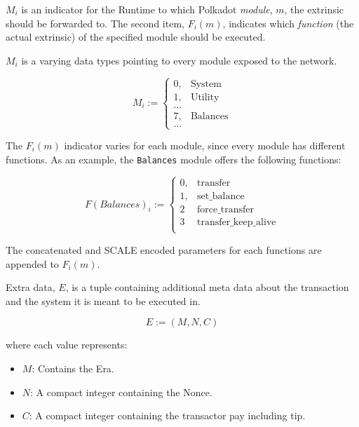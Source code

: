 \begin{definition}
    \label{defn-module-indicator}
    $M_i$ is an indicator for the Runtime to which Polkadot \textit{module},
    $m$, the extrinsic should be forwarded to. The second item, $F_i(m)$,
    indicates which \textit{function} (the actual extrinsic) of the specified
    module should be executed.
    \newline

    $M_i$ is a varying data types pointing to every module exposed to the
    network.

    \[
    M_i :=
    \begin{cases}
    0, & \text{System} \\
    1, & \text{Utility} \\
    ... & \\
    7, & \text{Balances} \\
    ... &
    \end{cases}
    \]
\end{definition}

\begin{definition}
    \label{defn-function-indicator}
    The $F_i(m)$ indicator varies for each module, since every module has
    different functions. As an example, the \verb|Balances| module offers the
    following functions:

    \[
    F(Balances)_i :=
    \begin{cases}
    0, & \text{transfer} \\
    1, & \text{set\_balance} \\
    2 & \text{force\_transfer} \\
    3 & \text{transfer\_keep\_alive} \\
    \end{cases}
    \]

    The concatenated and SCALE encoded parameters for each functions are
    appended to $F_i(m)$.
\end{definition}

\begin{definition}
    \label{defn-extra-data}
    Extra data, $E$, is a tuple containing additional meta data about the
    transaction and the system it is meant to be executed in. 

    \[
        E := (M, N, C)
    \]

    where each value represents:
    \begin{itemize}
        \item $M$: Contains the Era.
        \item $N$: A compact integer containing the Nonce.
        \item $C$: A compact integer containing the transactor pay including tip.
    \end{itemize}

\end{definition}
